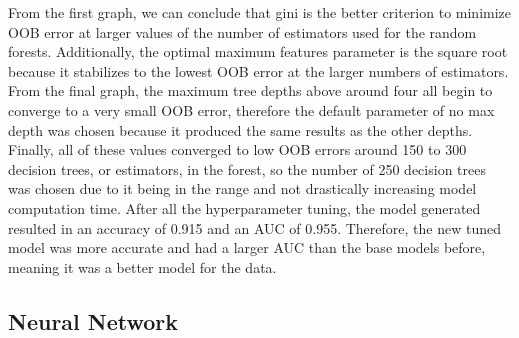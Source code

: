\documentclass{article}
\begin{document}
\noindent From the first graph, we can conclude that gini is the better criterion to minimize OOB error at larger values of the number of estimators used for the random forests. Additionally, the optimal maximum features parameter is the square root because it stabilizes to the lowest OOB error at the larger numbers of estimators. From the final graph, the maximum tree depths above around four all begin to converge to a very small OOB error, therefore the default parameter of no max depth was chosen because it produced the same results as the other depths. Finally, all of these values converged to low OOB errors around 150 to 300 decision trees, or estimators, in the forest, so the number of 250 decision trees was chosen due to it being in the range and not drastically increasing model computation time. After all the hyperparameter tuning, the model generated resulted in an accuracy of 0.915 and an AUC of 0.955. Therefore, the new tuned model was more accurate and had a larger AUC than the base models before, meaning it was a better model for the data.

\subsection{Neural Network}
\end{document}
